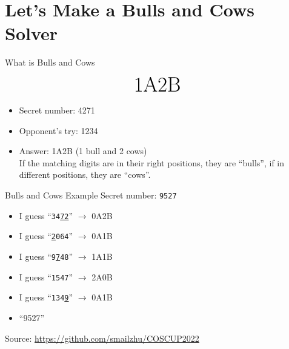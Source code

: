\documentclass[10pt]{beamer}
\begin{document}




\section{Let's Make a Bulls and Cows Solver}

\begin{frame}{What is Bulls and Cows}

\[\text{{\Huge 1A2B}}\]

\begin{itemize}
    \item Secret number: 4271
    \item Opponent's try: 1234
    \item Answer: 1A2B (1 bull and 2 cows)\\If the matching digits are in their right positions, they are ``bulls'', if in different positions, they are ``cows''.
\end{itemize}

\end{frame}

\begin{frame}{Bulls and Cows Example}
Secret number: \texttt{9527}
\begin{itemize}[<+(1)->]
    \item I guess ``\texttt{34\underline{72}}'' $\rightarrow$ 0A2B
    \item I guess ``\texttt{\underline{2}064}'' $\rightarrow$ 0A1B
    \item I guess ``\texttt{\alert{9}\underline{7}48}'' $\rightarrow$ 1A1B
    \item I guess ``\texttt{1\alert{5}4\alert{7}}'' $\rightarrow$ 2A0B
    \item I guess ``\texttt{134\underline{9}}'' $\rightarrow$ 0A1B
    \item ``9527''
\end{itemize}

Source: \url{https://github.com/smailzhu/COSCUP2022}


\end{frame}
\end{document}
